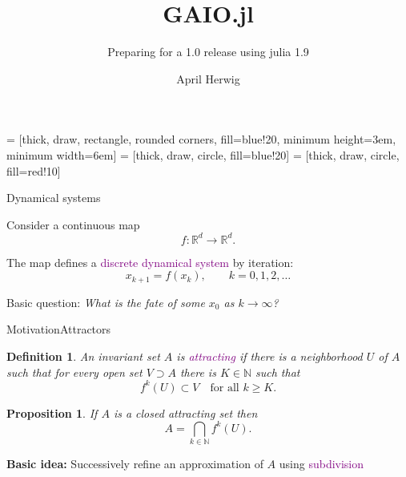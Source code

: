 \documentclass[
  english,            %
  aspectratio=169,    %
]{tumbeamer}
\title{GAIO.jl}
\subtitle{Preparing for a 1.0 release using julia 1.9}
\author{April Herwig}
\institute{\theChairName\\\theDepartmentName\\\theUniversityName}
\date{}
\newtheorem{definition}{Definition}
\newtheorem{proposition}{Proposition}
\newenvironment{emphbox}
  {\begin{tcolorbox}[colback=blue!5!white,colframe=blue!75!black]}
  {\end{tcolorbox}}
\newcommand{\R}{{\mathbb R}}
\newcommand{\N}{{\mathbb N}}
\renewcommand{\emph}[1]{\textcolor{purple}{#1}}
\begin{document}
 = [thick, draw, rectangle, rounded corners, fill=blue!20,
                       minimum height=3em, minimum width=6em]
 = [thick, draw, circle, fill=blue!20]
 = [thick, draw, circle, fill=red!10]

\maketitle

\begin{frame}{Dynamical systems}

Consider a continuous map
\[
f:\R^d\to \R^d.
\] 

The map defines a \emph{discrete dynamical system} by iteration:
\[
x_{k+1} = f(x_k), \qquad k=0,1,2,\ldots
\]

\begin{tcolorbox}[colback=blue!5!white,colframe=blue!75!black]
Basic question: \textit{What is the fate of some $x_0$ as $k\to\infty$?}
\end{tcolorbox}



\end{frame}

\begin{frame}{Motivation}{Attractors}

\begin{definition}
    An invariant set $A$ is \emph{attracting} if there is a neighborhood $U$ of $A$ such that for every open set $V\supset A$ there is $K\in\N$ such that
    \[
    f^k(U)\subset V \quad\text{for all } k\ge K.
    \]
\end{definition}

\begin{proposition}
    If $A$ is a closed attracting set then
    \[
    A = \bigcap_{k\in\N} f^k(U).
    \]
\end{proposition}

\begin{emphbox}
    \textbf{Basic idea:} Successively refine an approximation of $A$ using \emph{subdivision}
\end{emphbox}

\end{frame}
\end{document}
